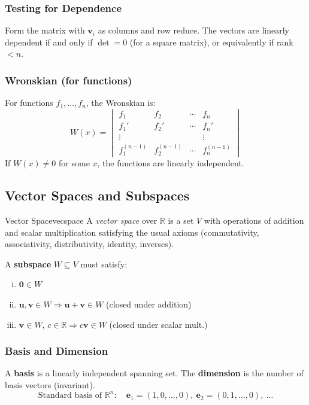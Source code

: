 \documentclass[11pt, letterpaper]{article}
\theoremstyle{plain}
\newcommand{\vv}[1]{\bm{#1}}
\begin{document}
\subsubsection*{Testing for Dependence}
Form the matrix with $\vv{v}_i$ as columns and row reduce.
The vectors are linearly dependent if and only if $\det = 0$
(for a square matrix), or equivalently if rank $< n$.

\subsubsection*{Wronskian (for functions)}
For functions $f_1,\ldots,f_n$, the Wronskian is:
\[
    W(x) = \begin{vmatrix}
        f_1 & f_2 & \cdots & f_n \\
        f_1' & f_2' & \cdots & f_n' \\
        \vdots & & & \vdots \\
        f_1^{(n-1)} & f_2^{(n-1)} & \cdots & f_n^{(n-1)}
    \end{vmatrix}
\]
If $W(x) \neq 0$ for some $x$, the functions are linearly independent.


\subsection{Vector Spaces and Subspaces}

\begin{definition}{Vector Space}{vecspace}
    A \emph{vector space} over $\mathbb{R}$ is a set $V$ with operations
    of addition and scalar multiplication satisfying the usual axioms
    (commutativity, associativity, distributivity, identity, inverses).
\end{definition}

A \textbf{subspace} $W \subseteq V$ must satisfy:
\begin{enumerate}[(i)]
    \item $\vv{0} \in W$
    \item $\vv{u}, \vv{v} \in W \Rightarrow \vv{u}+\vv{v} \in W$ (closed under addition)
    \item $\vv{v}\in W,\, c\in\mathbb{R} \Rightarrow c\vv{v}\in W$ (closed under scalar mult.)
\end{enumerate}

\subsubsection*{Basis and Dimension}
A \textbf{basis} is a linearly independent spanning set.
The \textbf{dimension} is the number of basis vectors (invariant).
\[
    \text{Standard basis of }\mathbb{R}^n:\quad
    \vv{e}_1 = (1,0,\ldots,0),\ \vv{e}_2 = (0,1,\ldots,0),\ \ldots
\]
\end{document}
